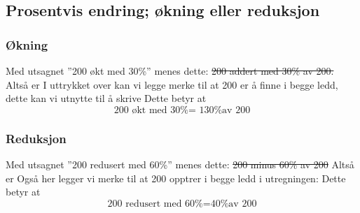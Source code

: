 \subsection{Prosentvis endring; økning eller reduksjon \label{Proendring}}
\subsubsection{Økning} \label{prookning}
Med utsagnet ''200 økt med 30\%'' menes dette:
\st{
200 addert med 30\% av 200.
}
Altså er
I uttrykket over kan vi legge merke  til at 200 er å finne i begge ledd, dette kan vi utnytte til å skrive
Dette betyr at
\[ \text{200 økt med 30\% = 130\% av 200} \] 

\subsubsection{Reduksjon} \label{proredusering}
Med utsagnet ''200 redusert med 60\%'' menes dette:
\st{200 minus 60\% av 200}
Altså er 
Også her legger vi merke til at 200 opptrer i begge ledd i utregningen:
Dette betyr at
\[ \text{200 redusert med 60\%}= \text{40\% av 200} \]

